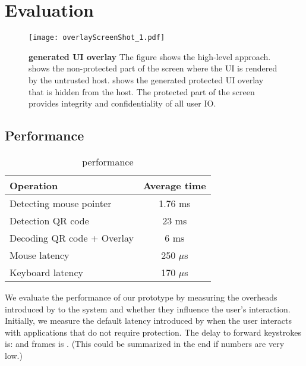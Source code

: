 \section{Evaluation}
\label{sec:eval}

\iffalse
\begin{figure}[t]
\centering
\texttt{[image: overlayScreenShot.pdf]}
\caption{\textbf{\name overlay}. }
\label{fig:screenshot_1}
\centering
\end{figure}
\fi


\begin{figure}[t]
\centering
\texttt{[image: overlayScreenShot\_1.pdf]}
\caption{\textbf{\device generated UI overlay} The figure shows the \name high-level approach. \one shows the non-protected part of the screen where the UI is rendered by the untrusted host. \two shows the \device generated protected UI overlay that is hidden from the host. The protected part of the screen provides integrity and confidentiality of all user IO.}
\spacesave
\label{fig:exampleImpelmentation}
\end{figure}




\subsection{Performance}


\begin{table}[t]
\centering
\begin{tabular}{l | c}
\textbf{Operation} & \textbf{Average time} \\\hline
Detecting mouse pointer & 1.76 ms \\
Detection QR code & 23 ms\\
Decoding QR code + Overlay & 6 ms\\
Mouse latency & 250 $\mu$s\\
Keyboard latency & 170 $\mu$s\\\hline
\end{tabular} 
\caption{\device performance}\spacesave
\end{table}


We evaluate the performance of our prototype by measuring the overheads introduced by \name to the system and whether they influence the user's interaction. Initially, we measure the default latency introduced by \device when the user interacts with applications that do not require protection. The delay to forward keystrokes is:  and frames is . (This could be summarized in the end if numbers are very low.)

